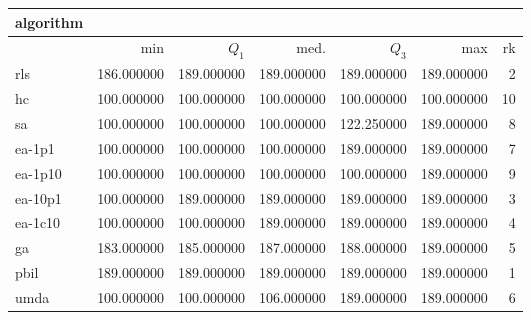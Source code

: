 \begin{tabular}{@{}l*{5}{>{{}}N{3}{0}}>{{}}N{2}{0}@{}}
\toprule
{algorithm} &  \\
\midrule
& {min} & {$Q_1$} & {med.} & {$Q_3$} & {max} & {rk}\\
\midrule
rls & 186.000000 & {\color{blue}} 189.000000 & {\color{blue}} 189.000000 & {\color{blue}} 189.000000 & {\color{blue}} 189.000000 & 2\\
hc & 100.000000 & 100.000000 & 100.000000 & 100.000000 & 100.000000 & 10\\
sa & 100.000000 & 100.000000 & 100.000000 & 122.250000 & {\color{blue}} 189.000000 & 8\\
ea-1p1 & 100.000000 & 100.000000 & 100.000000 & {\color{blue}} 189.000000 & {\color{blue}} 189.000000 & 7\\
ea-1p10 & 100.000000 & 100.000000 & 100.000000 & 100.000000 & {\color{blue}} 189.000000 & 9\\
ea-10p1 & 100.000000 & {\color{blue}} 189.000000 & {\color{blue}} 189.000000 & {\color{blue}} 189.000000 & {\color{blue}} 189.000000 & 3\\
ea-1c10 & 100.000000 & 100.000000 & {\color{blue}} 189.000000 & {\color{blue}} 189.000000 & {\color{blue}} 189.000000 & 4\\
ga & 183.000000 & 185.000000 & 187.000000 & 188.000000 & {\color{blue}} 189.000000 & 5\\
pbil & {\color{blue}} 189.000000 & {\color{blue}} 189.000000 & {\color{blue}} 189.000000 & {\color{blue}} 189.000000 & {\color{blue}} 189.000000 & 1\\
umda & 100.000000 & 100.000000 & 106.000000 & {\color{blue}} 189.000000 & {\color{blue}} 189.000000 & 6\\
\bottomrule
\end{tabular}
